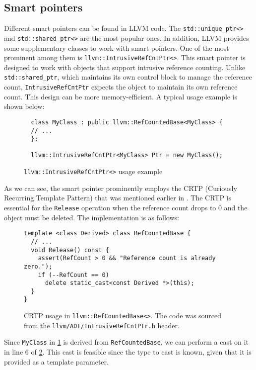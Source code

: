 \subsection{Smart pointers}
Different smart pointers can be found in LLVM code. The 
\texttt{std::unique_ptr<>} and \texttt{std::shared_ptr<>} 
are the most popular ones. In addition, LLVM provides some supplementary classes 
to work with smart pointers. One of the most prominent among them is 
\texttt{llvm::IntrusiveRefCntPtr<>}. This smart pointer is designed to 
work with objects that support intrusive reference counting. Unlike 
\texttt{std::shared_ptr}, which maintains its own control block to 
manage the reference count, \texttt{IntrusiveRefCntPtr} expects the 
object to maintain its own reference count. This design can be more 
memory-efficient. A typical usage example is shown below:

\begin{figure}[H]
  \begin{verbatim}
  class MyClass : public llvm::RefCountedBase<MyClass> {
  // ...
  };
  
  llvm::IntrusiveRefCntPtr<MyClass> Ptr = new MyClass();
  \end{verbatim}
  \caption{\texttt{llvm::IntrusiveRefCntPtr<>} usage example}
\label{lis:ch4:IntrusiveRefCntPtr_usage}
\end{figure}

As we can see, the smart pointer prominently employs the CRTP (Curiously
Recurring Template Pattern) that was mentioned earlier in 
. The CRTP is essential for the 
\texttt{Release} operation when the reference count drops to 0 and the
object must be deleted. The implementation is as follows:

\begin{figure}[H]
\begin{verbatim}
template <class Derived> class RefCountedBase {
  // ...
  void Release() const {
    assert(RefCount > 0 && "Reference count is already zero.");
    if (--RefCount == 0)
      delete static_cast<const Derived *>(this);
  }
}
\end{verbatim}
\caption{CRTP usage in \texttt{llvm::RefCountedBase<>}. The code was 
sourced from the \texttt{llvm/ADT/IntrusiveRefCntPtr.h} header.}
\label{lis:ch4:ref_counted_base}
\end{figure}

Since \texttt{MyClass} in \cref{lis:ch4:IntrusiveRefCntPtr_usage} is
derived from \texttt{RefCountedBase}, we can perform a cast on it in
line 6 of \cref{lis:ch4:ref_counted_base}. This cast is feasible since the type
to cast is known, given that it is provided as a template parameter. 

